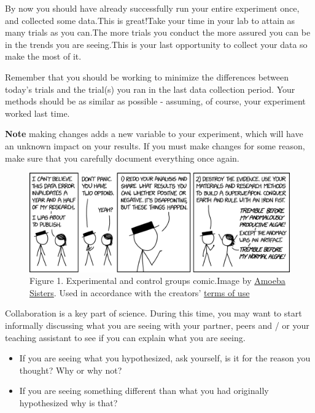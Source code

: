 \documentclass[
]{book}
\providecommand{\tightlist}{%
  \setlength{\itemsep}{0pt}\setlength{\parskip}{0pt}}
\begin{document}
By now you should have already successfully run your entire experiment once, and collected some data.This is great!Take your time in your lab to attain as many trials as you can.The more trials you conduct the more assured you can be in the trends you are seeing.This is your last opportunity to collect your data so make the most of it.

Remember that you should be working to minimize the differences between today's trials and the trial(s) you ran in the last data collection period. Your methods should be as similar as possible - assuming, of course, your experiment worked last time.

\textbf{Note} making changes adds a new variable to your experiment, which will have an unknown impact on your results. If you must make changes for some reason, make sure that you carefully document everything once again.

\begin{figure}
\centering
\includegraphics{figures_images/Lab8-Fig1.png}
\caption{Figure 1. Experimental and control groups comic.Image by \href{https://www.amoebasisters.com/parameciumparlorcomics/category/nature-of-science/2}{Amoeba Sisters}. Used in accordance with the creators' \href{https://www.amoebasisters.com/termsofuse.html}{terms of use}}
\end{figure}

Collaboration is a key part of science. During this time, you may want to start informally discussing what you are seeing with your partner, peers and / or your teaching assistant to see if you can explain what you are seeing.

\begin{itemize}
\tightlist
\item
  If you are seeing what you hypothesized, ask yourself, is it for the reason you thought? Why or why not?
\item
  If you are seeing something different than what you had originally hypothesized why is that?
\end{itemize}
\end{document}
